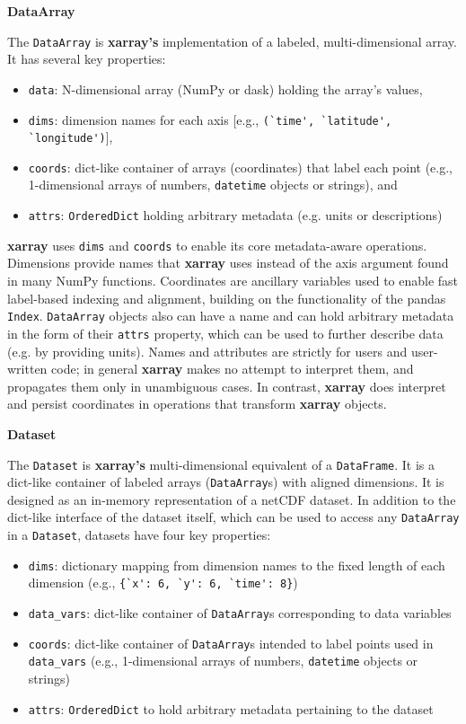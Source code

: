\documentclass{jors}
\begin{document}
\textbf{DataArray}

The \verb|DataArray| is \textbf{xarray's} implementation of a labeled, multi-dimensional array. It has several key properties:

\begin{itemize}
	\item \verb|data|: N-dimensional array (NumPy or dask) holding the array's values,
	\item \verb|dims|: dimension names for each axis [e.g., \verb|(`time', `latitude', `longitude')|],
	\item \verb|coords|: dict-like container of arrays (coordinates) that label each point (e.g., 1-dimensional arrays of numbers, \verb|datetime| objects or strings), and
	\item \verb|attrs|: \verb|OrderedDict| holding arbitrary metadata (e.g. units or descriptions)
\end{itemize}

\textbf{xarray} uses \verb|dims| and \verb|coords| to enable its core metadata-aware operations.
Dimensions provide names that \textbf{xarray} uses instead of the axis argument found in many NumPy functions.
Coordinates are ancillary variables used to enable fast label-based indexing and alignment, building on the functionality of the pandas \verb|Index|.
\verb|DataArray| objects also can have a name and can hold arbitrary metadata in the form of their \verb|attrs| property, which can be used to further describe data (e.g. by providing units).
Names and attributes are strictly for users and user-written code; in general \textbf{xarray} makes no attempt to interpret them, and propagates them only in unambiguous cases.
In contrast, \textbf{xarray} does interpret and persist coordinates in operations that transform \textbf{xarray} objects.

\textbf{Dataset}

The \verb|Dataset| is \textbf{xarray's} multi-dimensional equivalent of a \verb|DataFrame|. It is a dict-like container of labeled arrays (\verb|DataArray|s) with aligned dimensions.
It is designed as an in-memory representation of a netCDF dataset.
In addition to the dict-like interface of the dataset itself, which can be used to access any \verb|DataArray| in a \verb|Dataset|, datasets have four key properties:

\begin{itemize}
	\item \verb|dims|: dictionary mapping from dimension names to the fixed length of each dimension (e.g., \verb|{`x': 6, `y': 6, `time': 8}|)
	\item \verb|data_vars|: dict-like container of \verb|DataArray|s corresponding to data variables
	\item \verb|coords|: dict-like container of \verb|DataArray|s intended to label points used in \verb|data_vars| (e.g., 1-dimensional arrays of numbers, \verb|datetime| objects or strings)
	\item \verb|attrs|: \verb|OrderedDict| to hold arbitrary metadata pertaining to the dataset
\end{itemize}
\end{document}
